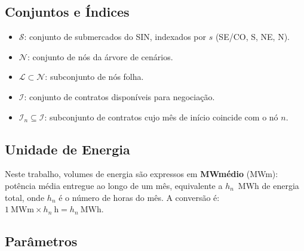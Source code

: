 \subsection*{Conjuntos e \'Indices}

\begin{itemize}
  \item $\mathcal{S}$: conjunto de submercados do SIN, indexados por $s$ (SE/CO, S, NE, N).
  \item $\mathcal{N}$: conjunto de n\'os da \'arvore de cen\'arios.
  \item $\mathcal{L} \subset \mathcal{N}$: subconjunto de n\'os folha.
  \item $\mathcal{I}$: conjunto de contratos dispon\'iveis para negocia\c{c}\~ao.
  \item $\mathcal{I}_n \subseteq \mathcal{I}$: subconjunto de contratos cujo m\^es de in\'icio coincide com o n\'o $n$.
\end{itemize}

\subsection*{Unidade de Energia}

Neste trabalho, volumes de energia s\~ao expressos em \textbf{MWm\'edio} (MWm): pot\^encia m\'edia entregue ao longo de um m\^es, equivalente a $h_n$~MWh de energia total, onde $h_n$ \'e o n\'umero de horas do m\^es. A convers\~ao \'e: $1~\text{MWm} \times h_n~\text{h} = h_n~\text{MWh}$.

\subsection*{Par\^ametros}

